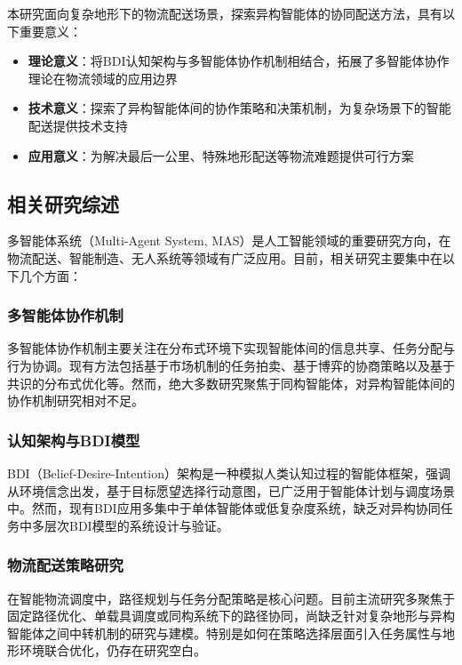 \documentclass[12pt,a4paper]{article}
\begin{document}
本研究面向复杂地形下的物流配送场景，探索异构智能体的协同配送方法，具有以下重要意义：

\begin{itemize}
    \item \textbf{理论意义}：将BDI认知架构与多智能体协作机制相结合，拓展了多智能体协作理论在物流领域的应用边界
    \item \textbf{技术意义}：探索了异构智能体间的协作策略和决策机制，为复杂场景下的智能配送提供技术支持
    \item \textbf{应用意义}：为解决最后一公里、特殊地形配送等物流难题提供可行方案
\end{itemize}

\subsection{相关研究综述}

多智能体系统（Multi-Agent System, MAS）是人工智能领域的重要研究方向，在物流配送、智能制造、无人系统等领域有广泛应用。目前，相关研究主要集中在以下几个方面：

\subsubsection{多智能体协作机制}

多智能体协作机制主要关注在分布式环境下实现智能体间的信息共享、任务分配与行为协调。现有方法包括基于市场机制的任务拍卖、基于博弈的协商策略以及基于共识的分布式优化等。然而，绝大多数研究聚焦于同构智能体，对异构智能体间的协作机制研究相对不足。

\subsubsection{认知架构与BDI模型}

BDI（Belief-Desire-Intention）架构\cite{rao1995bdi}是一种模拟人类认知过程的智能体框架，强调从环境信念出发，基于目标愿望选择行动意图，已广泛用于智能体计划与调度场景中。然而，现有BDI应用多集中于单体智能体或低复杂度系统，缺乏对异构协同任务中多层次BDI模型的系统设计与验证。

\subsubsection{物流配送策略研究}

在智能物流调度中，路径规划与任务分配策略是核心问题。目前主流研究多聚焦于固定路径优化、单载具调度或同构系统下的路径协同，尚缺乏针对复杂地形与异构智能体之间中转机制的研究与建模。特别是如何在策略选择层面引入任务属性与地形环境联合优化，仍存在研究空白。
\end{document}
